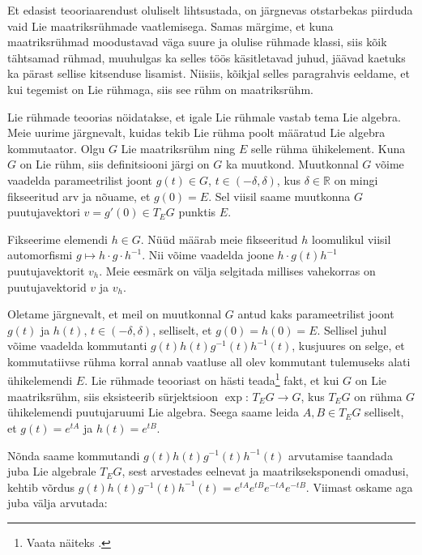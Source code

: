 \documentclass[12pt,a4paper,oneside]{article}
\theoremstyle{plain}
\theoremstyle{definition}
\numberwithin{equation}{section}
\def\R{{\mathbb R}}
\begin{document}
Et edasist teooriaarendust oluliselt lihtsustada, on järgnevas 
otstarbekas piirduda vaid Lie maatriksrühmade vaatlemisega. Samas 
märgime, et kuna maatriksrühmad moodustavad väga suure ja olulise 
rühmade klassi, siis kõik tähtsamad rühmad, muuhulgas ka selles töös 
käsitletavad juhud, jäävad kaetuks ka pärast sellise kitsenduse 
lisamist. Niisiis, kõikjal selles paragrahvis eeldame, et kui 
tegemist on Lie rühmaga, siis see rühm on maatriksrühm.

Lie rühmade teoorias nöidatakse, et igale Lie rühmale vastab tema 
Lie algebra. Meie uurime järgnevalt, kuidas tekib Lie rühma poolt 
määratud Lie algebra kommutaator. Olgu $G$ Lie maatriksrühm ning $E$ 
selle rühma ühikelement. Kuna $G$ on Lie rühm, siis definitsiooni 
järgi on $G$ ka muutkond. Muutkonnal $G$ võime vaadelda 
parameetrilist joont 
$g\left(t\right) \in G$, $t \in \left(-\delta, \delta\right)$, kus 
$\delta \in \R$ on mingi fikseeritud arv ja nõuame, et 
$g\left(0\right) = E$. Sel viisil saame muutkonna $G$ puutujavektori 
$v = g'\left(0\right) \in T_E G$ punktis $E$.

Fikseerime elemendi $h \in G$. Nüüd määrab meie fikseeritud $h$ 
loomulikul viisil automorfismi $g \mapsto h \cdot g \cdot h^{-1}$. 
Nii võime vaadelda joone $h \cdot g\left(t\right) h^{-1}$ 
puutujavektorit $v_h$. Meie eesmärk on välja selgitada millises 
vahekorras on puutujavektorid $v$ ja $v_h$.

Oletame järgnevalt, et meil on muutkonnal $G$ antud kaks 
parameetrilist joont $g\left(t\right)$ ja $h\left(t\right)$, 
$t \in \left(-\delta, \delta\right)$, selliselt, et 
$g\left(0\right) = h\left(0\right) = E$. Sellisel juhul võime 
vaadelda kommutanti $g\left(t\right) h\left(t\right) 
g^{-1}\left(t\right) h^{-1}\left(t\right)$, kusjuures on selge, et 
kommutatiivse rühma korral annab vaatluse all olev kommutant 
tulemuseks alati ühikelemendi $E$. Lie rühmade teooriast on hästi 
teada\footnote{Vaata näiteks \cite[Exponential map]{Kirillov}.} fakt, 
et kui $G$ on Lie maatriksrühm, siis eksisteerib sürjektsioon 
$\exp \colon\, T_E G \rightarrow G$, kus $T_E G$ on rühma $G$ ühikelemendi 
puutujaruumi Lie algebra. Seega saame leida $A, B \in T_E G$ 
selliselt, et $g\left(t\right) = e^{tA}$ ja $h\left(t\right) = 
e^{tB}$. 

Nõnda saame kommutandi 
$g\left(t\right) h\left(t\right) g^{-1}\left(t\right) 
h^{-1}\left(t\right)$ arvutamise taandada juba Lie algebrale 
$T_E G$, sest arvestades eelnevat ja maatrikseksponendi omadusi, 
kehtib võrdus $g\left(t\right) h\left(t\right) g^{-1}\left(t\right) 
h^{-1}\left(t\right) = e^{tA} e^{tB} e^{-tA} e^{-tB}$. 
Viimast oskame aga juba välja arvutada:
\end{document}
